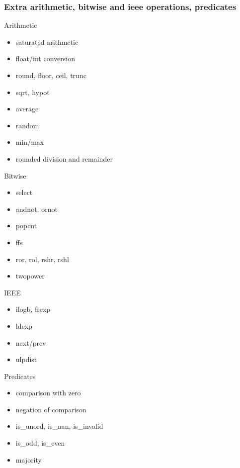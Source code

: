 \documentclass{beamer}
\begin{document}
\begin{frame}
	\frametitle{Extra arithmetic, bitwise and ieee operations, predicates}
	
	\begin{multicols}{3}		
	
		Arithmetic
		\begin{itemize}
			\item saturated arithmetic
			\item float/int conversion
			\item round, floor, ceil, trunc
			\item sqrt, hypot
			\item average
			\item random
			\item min/max
			\item rounded division and remainder
		\end{itemize}

		Bitwise
		\begin{itemize}			
			\item select
			\item andnot, ornot
			\item popcnt
			\item ffs
			\item ror, rol, rshr, rshl
			\item twopower
		\end{itemize}
			
		IEEE
		\begin{itemize}
			\item ilogb, frexp
			\item ldexp
			\item next/prev
			\item ulpdist
		\end{itemize}
			
		Predicates
		\begin{itemize}
			\item comparison with zero
			\item negation of comparison
			\item is\_unord, is\_nan, is\_invalid
			\item is\_odd, is\_even
			\item majority
		\end{itemize}
		
		\vfill
	
	\end{multicols}
	
\end{frame}
\end{document}
